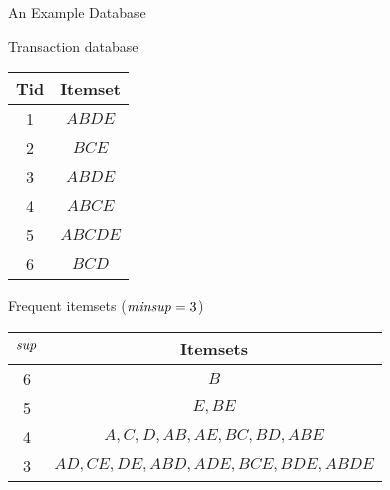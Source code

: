 
\date{Chapter 9: Summarizing Itemsets}

\begin{frame}
\titlepage
\end{frame}


\newcommand{\alggenmax}{\textsc{GenMax}\xspace}
\newcommand{\algcharm}{\textsc{Charm}\xspace}
\newcommand{\algndi}{\textsc{NDI}\xspace}
\newcommand{\algcomputebounds}{\textsc{ComputeBounds}\xspace}

\begin{frame}{An Example Database}
\begin{footnotesize}
\begin{minipage}{1.5in}
\begin{center}
Transaction database \\[0.5cm]

  \centering
\begin{tabular}{|c|c|}
  \hline
  Tid & Itemset\\
\hline
1 & $\mathit{ABDE}$\\
2 & $\mathit{BCE}$\\
3 & $\mathit{ABDE}$\\
4 & $\mathit{ABCE}$\\
5 & $\mathit{ABCDE}$\\
6 & $\mathit{BCD}$\\
\hline
\end{tabular}
\end{center}
\end{minipage}
\hspace{0.1in} 
\begin{minipage}{6cm}
\begin{center}
Frequent itemsets ($\mathit{minsup} = 3$) \\[0.5cm]

\begin{tabular}{|c|c|}
\hline
$\mathit{sup}$ & Itemsets\\
\hline
6 & $B$\\
5 & $E, \mathit{BE}$\\
4 & $A, C, D, \mathit{AB}, \mathit{AE}, \mathit{BC}, \mathit{BD}, \mathit{ABE}$\\
3 &  $\mathit{AD}, \mathit{CE}, \mathit{DE}, \mathit{ABD}, \mathit{ADE}, \mathit{BCE}, \mathit{BDE}, \mathit{ABDE}$\\
\hline
\end{tabular}
\end{center}
\end{minipage}
\end{footnotesize}
\end{frame}


